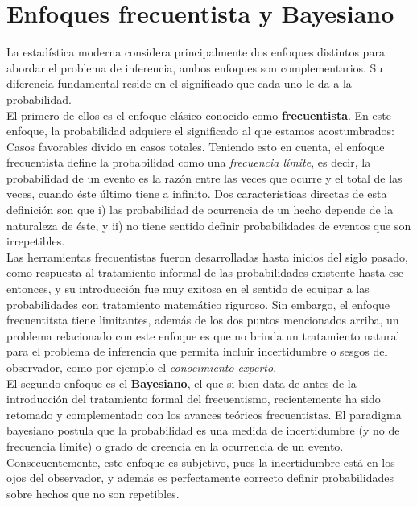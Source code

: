 \section{Enfoques frecuentista y Bayesiano}

La estadística moderna considera principalmente dos enfoques distintos para abordar el problema de inferencia, ambos enfoques son complementarios. Su diferencia fundamental reside en el significado que cada uno le da a la probabilidad.\\

El primero de ellos es el enfoque clásico conocido como \textbf{frecuentista}. En este enfoque, la probabilidad adquiere el significado al que estamos acostumbrados: Casos favorables divido en casos totales. Teniendo esto en cuenta, el enfoque frecuentista define la probabilidad como una \emph{frecuencia límite}, es decir, la probabilidad de un evento es la razón entre las veces que ocurre y el total de las veces, cuando éste último tiene a infinito. Dos características directas de esta definición son que i) las probabilidad de ocurrencia de un hecho depende de la naturaleza de éste, y ii) no tiene sentido definir probabilidades de eventos que son irrepetibles.\\

Las herramientas frecuentistas fueron desarrolladas hasta inicios del siglo pasado, como respuesta al tratamiento informal de las probabilidades existente hasta ese entonces, y su introducción fue muy exitosa en el sentido de equipar a las probabilidades con tratamiento matemático riguroso. Sin embargo, el enfoque frecuentitsta tiene limitantes, además de los dos puntos mencionados arriba, un problema relacionado con este enfoque es que no brinda un tratamiento natural para el problema de inferencia que permita incluir incertidumbre o sesgos del observador, como por ejemplo el  \emph{conocimiento experto}.\\

El segundo enfoque es el \textbf{Bayesiano}, el que si bien data de antes de la introducción del tratamiento formal del frecuentismo, recientemente ha sido retomado y complementado con los avances teóricos frecuentistas. El paradigma bayesiano postula que la probabilidad es una medida de incertidumbre (y no de frecuencia límite) o grado de creencia en la ocurrencia de un evento. Consecuentemente, este enfoque es subjetivo, pues la incertidumbre está en los ojos del observador, y además es perfectamente correcto definir probabilidades sobre hechos que no son repetibles. \\

